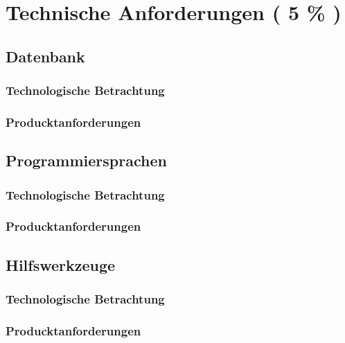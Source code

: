 \chapter{Technische Anforderungen ( 5 \% )}
\section{Datenbank}
\subsection{Technologische Betrachtung}
\subsection{Producktanforderungen}
\section{Programmiersprachen}
\subsection{Technologische Betrachtung}
\subsection{Producktanforderungen}
\section{Hilfswerkzeuge}
\subsection{Technologische Betrachtung}
\subsection{Producktanforderungen}
